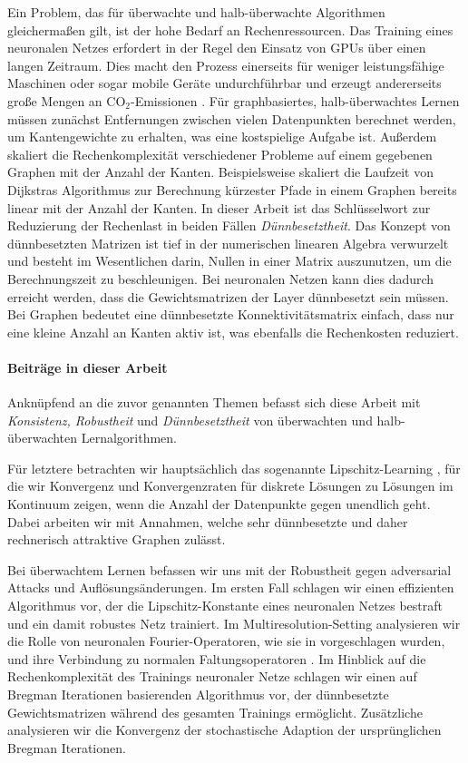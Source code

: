Ein Problem, das für überwachte und halb-überwachte Algorithmen gleicherma\ss{}en gilt, ist der hohe Bedarf an Rechenressourcen. Das Training eines neuronalen Netzes erfordert in der Regel den Einsatz von GPUs über einen langen Zeitraum. Dies macht den Prozess einerseits für weniger leistungsfähige Maschinen oder sogar mobile Geräte undurchführbar und erzeugt andererseits gro\ss{}e Mengen an CO$_2$-Emissionen \cite{hoefler2021sparsity}. Für graphbasiertes, halb-überwachtes Lernen müssen zunächst Entfernungen zwischen vielen Datenpunkten berechnet werden, um Kantengewichte zu erhalten, was eine kostspielige Aufgabe ist. Au\ss{}erdem skaliert die Rechenkomplexität verschiedener Probleme auf einem gegebenen Graphen mit der Anzahl der Kanten. Beispielsweise skaliert die Laufzeit von Dijkstras Algorithmus zur Berechnung kürzester Pfade in einem Graphen bereits linear mit der Anzahl der Kanten. In dieser Arbeit ist das Schlüsselwort zur Reduzierung der Rechenlast in beiden Fällen \textit{Dünnbesetztheit}. Das Konzept von dünnbesetzten Matrizen ist tief in der numerischen linearen Algebra verwurzelt \cite{lanczos1952solution,golub2013matrix} und besteht im Wesentlichen darin, Nullen in einer Matrix auszunutzen, um die Berechnungszeit zu beschleunigen. Bei neuronalen Netzen kann dies dadurch erreicht werden, dass die Gewichtsmatrizen der Layer dünnbesetzt sein müssen. Bei Graphen bedeutet eine dünnbesetzte Konnektivitätsmatrix einfach, dass nur eine kleine Anzahl an Kanten aktiv ist, was ebenfalls die Rechenkosten reduziert.
%
%
\paragraph{Beiträge in dieser Arbeit}
%
Anknüpfend an die zuvor genannten Themen befasst sich diese Arbeit mit \textit{Konsistenz, Robustheit} und \textit{Dünnbesetztheit} von überwachten und halb-überwachten Lernalgorithmen. 


Für letztere betrachten wir hauptsächlich das sogenannte Lipschitz-Learning \cite{nadler2009statistical}, für die wir Konvergenz und Konvergenzraten für diskrete Lösungen zu Lösungen im Kontinuum zeigen, wenn die Anzahl der Datenpunkte gegen unendlich geht. Dabei arbeiten wir mit Annahmen, welche sehr dünnbesetzte und daher rechnerisch attraktive Graphen zulässt.


Bei überwachtem Lernen befassen wir uns mit der Robustheit gegen adversarial Attacks und Auflösungsänderungen. Im ersten Fall schlagen wir einen effizienten Algorithmus vor, der die Lipschitz-Konstante \cite{lipschitz1877lehrbuch} eines neuronalen Netzes bestraft und ein damit robustes Netz trainiert. Im Multiresolution-Setting analysieren wir die Rolle von neuronalen Fourier-Operatoren, wie sie in \cite{li2020fourier} vorgeschlagen wurden, und ihre Verbindung zu normalen Faltungsoperatoren \cite{fukushima1980neocognitron}. Im Hinblick auf die Rechenkomplexität des Trainings neuronaler Netze schlagen wir einen auf Bregman Iterationen basierenden Algorithmus \cite{osher2005iterative} vor, der dünnbesetzte Gewichtsmatrizen während des gesamten Trainings ermöglicht. Zusätzliche analysieren wir die Konvergenz der stochastische Adaption der ursprünglichen Bregman Iterationen.



